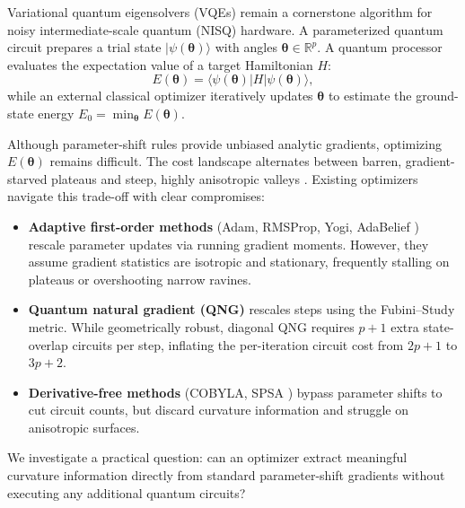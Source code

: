 \documentclass[11pt,a4paper]{article}
\begin{document}
Variational quantum eigensolvers (VQEs) \cite{peruzzo2014variational,mcclean2016theory} remain a cornerstone algorithm for noisy intermediate-scale quantum (NISQ) hardware. A parameterized quantum circuit prepares a trial state $|\psi(\boldsymbol{\theta})\rangle$ with angles $\boldsymbol{\theta} \in \mathbb{R}^p$. A quantum processor evaluates the expectation value of a target Hamiltonian $H$:
\begin{equation}
E(\boldsymbol{\theta}) = \langle \psi(\boldsymbol{\theta}) | H | \psi(\boldsymbol{\theta}) \rangle,
\label{eq:vqe_cost}
\end{equation}
while an external classical optimizer iteratively updates $\boldsymbol{\theta}$ to estimate the ground-state energy $E_0 = \min_{\boldsymbol{\theta}} E(\boldsymbol{\theta})$.

Although parameter-shift rules \cite{mitarai2018quantum,schuld2019evaluating} provide unbiased analytic gradients, optimizing $E(\boldsymbol{\theta})$ remains difficult. The cost landscape alternates between barren, gradient-starved plateaus and steep, highly anisotropic valleys \cite{mcclean2018barren,cerezo2021cost,wierichs2020avoiding}. Existing optimizers navigate this trade-off with clear compromises:
\begin{itemize}
    \item \textbf{Adaptive first-order methods} (Adam, RMSProp, Yogi, AdaBelief \cite{kingma2014adam,tieleman2012lecture,zaheer2018adaptive,zhuang2020adabelief}) rescale parameter updates via running gradient moments. However, they assume gradient statistics are isotropic and stationary, frequently stalling on plateaus or overshooting narrow ravines.
    \item \textbf{Quantum natural gradient (QNG)} \cite{stokes2020quantum,wierichs2020avoiding} rescales steps using the Fubini--Study metric. While geometrically robust, diagonal QNG requires $p+1$ extra state-overlap circuits per step, inflating the per-iteration circuit cost from $2p+1$ to $3p+2$.
    \item \textbf{Derivative-free methods} (COBYLA, SPSA \cite{powell1994direct,spall1992multivariate,novak2025benchmarking}) bypass parameter shifts to cut circuit counts, but discard curvature information and struggle on anisotropic surfaces.
\end{itemize}

We investigate a practical question: can an optimizer extract meaningful curvature information directly from standard parameter-shift gradients without executing any additional quantum circuits?
\end{document}
